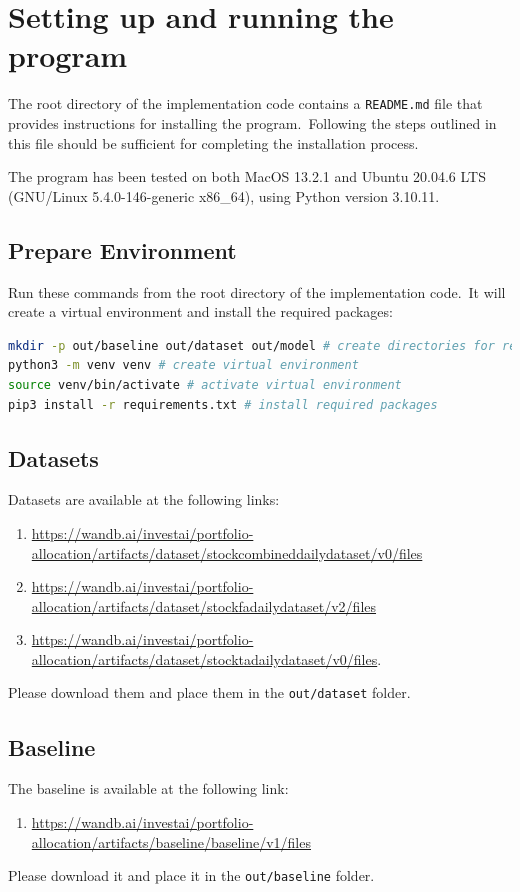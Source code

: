 \documentclass[../xlapes02]{subfiles}
\begin{document}


    \chapter{Setting up and running the program}\label{ch:setting-up-and-running-the-program}
    The root directory of the implementation code contains a \texttt{README.md} file that provides instructions for installing the program.\ Following the steps outlined in this file should be sufficient for completing the installation process.

    The program has been tested on both MacOS 13.2.1 and Ubuntu 20.04.6 LTS (GNU/Linux 5.4.0-146-generic x86\_64), using Python version 3.10.11.


    \section{Prepare Environment}\label{sec:prepare-environment}
    Run these commands from the root directory of the implementation code.\ It will create a virtual environment and install the required packages:
    \begin{lstlisting}[language=bash,label={lst:prepare-environment}]
mkdir -p out/baseline out/dataset out/model # create directories for results
python3 -m venv venv # create virtual environment
source venv/bin/activate # activate virtual environment
pip3 install -r requirements.txt # install required packages
    \end{lstlisting}


    \section{Datasets}\label{sec:datasets2}
    Datasets are available at the following links:
    \begin{enumerate}
        \item \url{https://wandb.ai/investai/portfolio-allocation/artifacts/dataset/stockcombineddailydataset/v0/files}
        \item \url{https://wandb.ai/investai/portfolio-allocation/artifacts/dataset/stockfadailydataset/v2/files}
        \item \url{https://wandb.ai/investai/portfolio-allocation/artifacts/dataset/stocktadailydataset/v0/files}.
    \end{enumerate}
    Please download them and place them in the \texttt{out/dataset} folder.


    \section{Baseline}\label{sec:baseline}
    The baseline is available at the following link:
    \begin{enumerate}
        \item \url{https://wandb.ai/investai/portfolio-allocation/artifacts/baseline/baseline/v1/files}
    \end{enumerate}
    Please download it and place it in the \texttt{out/baseline} folder.
\end{document}
